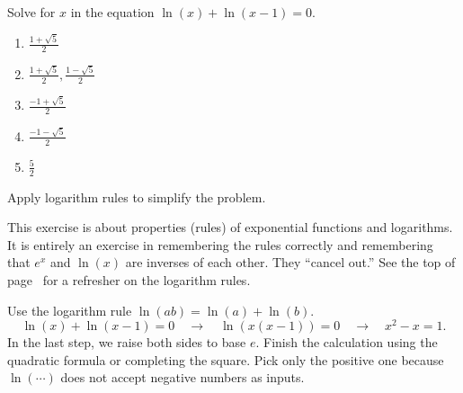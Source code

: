 \documentclass[../main.tex]{subfiles}
\begin{document}
\begin{exercise} \label{ex:midterm-exercise-5}
  Solve for \(x\) in the equation \(\ln(x) + \ln(x - 1) = 0\).
  \begin{enumerate}[label=\Alph*.]
    \item \(\frac{1 + \sqrt{5}}{2}\)
    \item \(\frac{1 + \sqrt{5}}{2}, \frac{1 - \sqrt{5}}{2}\)
    \item \(\frac{-1 + \sqrt{5}}{2}\)
    \item \(\frac{-1 - \sqrt{5}}{2}\)
    \item \(\frac{5}{2}\)
  \end{enumerate}

  \begin{hint}
    Apply logarithm rules to simplify the problem.
  \end{hint}

  \begin{solution}
    This exercise is about properties (rules) of exponential functions and logarithms.  It is entirely an exercise in remembering the rules correctly and remembering that \(e^{x}\) and \(\ln(x)\) are inverses of each other. They ``cancel out.'' See the top of page~\pageref{eq:log-formulas} for a refresher on the logarithm rules.

    Use the logarithm rule \(\ln(ab) = \ln(a) + \ln(b)\). \[\ln(x) + \ln(x - 1) = 0 \quad\longrightarrow\quad \ln(x(x-1)) = 0 \quad\longrightarrow\quad x^{2} - x = 1.\] In the last step, we raise both sides to base \(e\).  Finish the calculation using the quadratic formula or completing the square. Pick only the positive one because \(\ln(\cdots)\) does not accept negative numbers as inputs.
  \end{solution}
\end{exercise}
\end{document}
